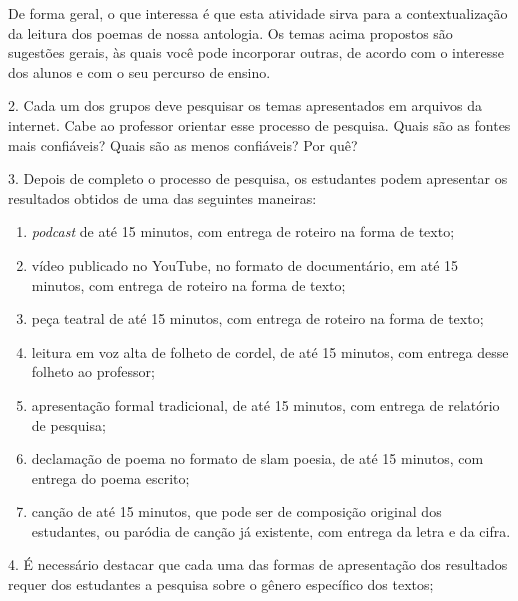 \documentclass[11pt]{extarticle}
\begin{document}
De forma geral, o que interessa é que esta atividade sirva para a
contextualização da leitura dos poemas de nossa antologia. Os temas
acima propostos são sugestões gerais, às quais você pode incorporar
outras, de acordo com o interesse dos alunos e com o seu percurso de
ensino.

\vspace{3mm}

2. Cada um dos grupos deve pesquisar os temas apresentados em arquivos
da internet. Cabe ao professor orientar esse processo de pesquisa. Quais
são as fontes mais confiáveis? Quais são as menos confiáveis? Por quê?

\vspace{3mm}

3. Depois de completo o processo de pesquisa, os estudantes podem
apresentar os resultados obtidos de uma das seguintes maneiras:

\begin{enumerate}

\item \textit{podcast} de até 15 minutos, com entrega de roteiro na forma de texto;

\item vídeo publicado no YouTube, no formato de documentário, em até 15
minutos, com entrega de roteiro na forma de texto;

\item peça teatral de até 15 minutos, com entrega de roteiro na forma de
texto;

\item leitura em voz alta de folheto de cordel, de até 15 minutos, com
entrega desse folheto ao professor;

\item apresentação formal tradicional, de até 15 minutos, com entrega de
relatório de pesquisa;

\item declamação de poema no formato de slam poesia, de até 15 minutos, com
entrega do poema escrito;

\item canção de até 15 minutos, que pode ser de composição original dos
estudantes, ou paródia de canção já existente, com entrega da letra e da
cifra.
\end{enumerate}

4. É necessário destacar que cada uma das formas de apresentação dos
resultados requer dos estudantes a pesquisa sobre o gênero específico
dos textos;
\end{document}
